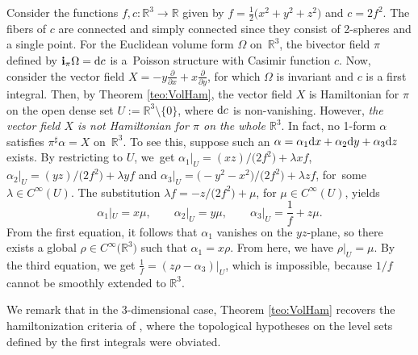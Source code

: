 \documentclass[10pt,a4paper]{amsart}
\newcommand{\R}[1]{\mathbb{R}^{#1}}
\newcommand{\dd}{{\rm d}}
\newcommand{\ii}{\mathbf{i}}
\numberwithin{equation}{section}
\begin{document}
\begin{Example}\label{ex:IntSing}
Consider the functions $f,c\colon \R{3} \to \mathbb{R}$ given by $f= \tfrac{1}{2}\big(x^2+y^2+z^2\big)$ and $c = 2f^2$. The fibers of $c$ are connected and simply connected since they consist of 2-spheres and a single point. For the Euclidean volume form $\Omega$ on~$\R{3}$, the bivector field $\pi$ defined by $\ii_{\pi}\Omega = \dd c$ is a~Pois\-son structure with Casimir function $c$. Now, consider the vector field $X=-y\tfrac{\partial}{\partial x}+x\tfrac{\partial}{\partial y}$, for which $\Omega$ is invariant and $c$ is a first integral. Then, by Theorem \ref{teo:VolHam}, the vector field $X$ is Hamiltonian for $\pi$ on the open dense set $U:=\R{3} \setminus \{0\}$, where $\dd c$ is non-vanishing. However, \emph{the vector field $X$ is not Hamiltonian for $\pi$ on the whole $\R{3}$}.
In fact, no 1-form $\alpha$ satisfies $\pi^{\sharp}\alpha = X$ on~$\R{3}$. To see this, suppose such an $\alpha = \alpha_{1}\dd{x} + \alpha_{2}\dd{y} + \alpha_{3}\dd{z}$ exists. By restricting to $U$, we~get $\alpha_1|_{U} = (xz)/\big(2f^2\big) + \lambda xf$, $\alpha_2|_{U} = (yz)/\big(2f^2\big) + \lambda yf$ and $\alpha_3|_{U} = \big({-}y^2-x^2\big)/\big(2f^2\big) + \lambda zf$, for~some $\lambda \in C^{\infty}(U)$. The substitution $\lambda f = -z/\big(2f^2\big) + \mu$, for $\mu \in C^{\infty}(U)$, yields
 \begin{equation*}
 \alpha_1|_{U} = x\mu, \qquad \alpha_2|_{U} = y\mu, \qquad \alpha_3|_{U} = \frac{1}{f} + z\mu.
 \end{equation*}
From the first equation, it follows that $\alpha_{1}$ vanishes on the $yz$-plane, so there exists a global $\rho \in C^{\infty}\big(\R{3}\big)$ such that $\alpha_{1} = x\rho$. From here, we have $\rho|_{U} = \mu$. By the third equation, we get $\tfrac{1}{f} = (z\rho-\alpha_{3})|_{U}$, which is impossible, because ${1}/{f}$ cannot be smoothly extended to $\R{3}$.
\end{Example}

We remark that in the 3-dimensional case, Theorem \ref{teo:VolHam} recovers the hamiltonization criteria of \cite[first theorem]{Gao-2000}, where the topological hypotheses on the level sets defined by the first integrals were obviated.
\end{document}
